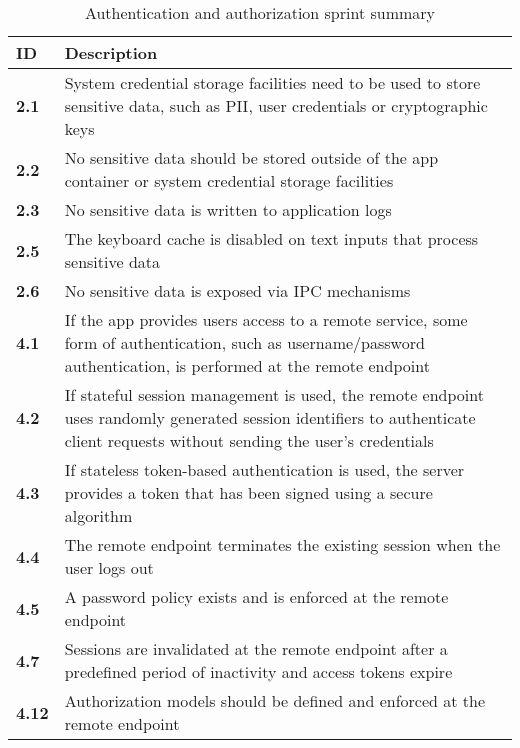 \begin{table}[!h]
    \centering
    \caption{Authentication and authorization sprint summary}
    \label{tab:auth-sprint-summary}
    \begin{tabulary}{1.0\textwidth}{|l|L|}
        \hline
        \textbf{ID} & \textbf{Description} \\
        \hline
        \textbf{2.1} &  System credential storage facilities need to be used to store sensitive data, such as PII, user credentials or cryptographic keys \\
        \hline
        \textbf{2.2} & No sensitive data should be stored outside of the app container or system credential storage facilities \\
        \hline
        \textbf{2.3} & No sensitive data is written to application logs \\
        \hline
        \textbf{2.5} & The keyboard cache is disabled on text inputs that process sensitive data \\
        \hline
        \textbf{2.6} &  No sensitive data is exposed via IPC mechanisms \\
        \hline
        \textbf{4.1} & If the app provides users access to a remote service, some form of authentication, such as username/password authentication, is performed at the remote endpoint \\
        \hline
        \textbf{4.2} & If stateful session management is used, the remote endpoint uses randomly generated session identifiers to authenticate client requests without sending the user's credentials \\
        \textbf{4.3} & If stateless token-based authentication is used, the server provides a token that has been signed using a secure algorithm \\
        \textbf{4.4} & The remote endpoint terminates the existing session when the user logs out \\
        \textbf{4.5} & A password policy exists and is enforced at the remote endpoint \\
        \textbf{4.7} & Sessions are invalidated at the remote endpoint after a predefined period of inactivity and access tokens expire \\
        \textbf{4.12} & Authorization models should be defined and enforced at the remote endpoint \\ 
        \hline
    \end{tabulary}
\end{table}

